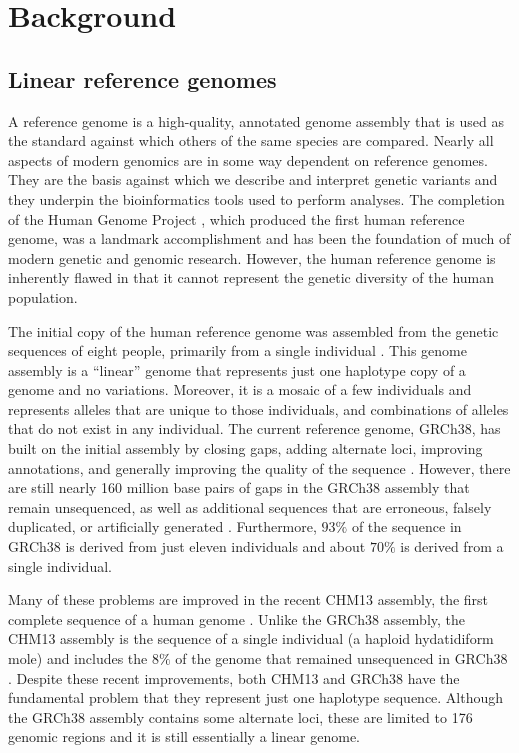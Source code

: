 \documentclass[11pt]{ucscthesis}
\begin{document}
\chapter{Background}
\label{chapter:background}

\section{Linear reference genomes}
\label{sec:background:linear-genomes}

A reference genome is a high-quality, annotated genome assembly that is used as the standard against which others of the same species are compared. 
Nearly all aspects of modern genomics are in some way dependent on reference genomes.
They are the basis against which we describe and interpret genetic variants and they underpin the bioinformatics tools used to perform analyses.
The completion of the Human Genome Project \cite{lander_initial_2001}, which produced the first human reference genome, was a landmark accomplishment and has been the foundation of much of modern genetic and genomic research.
However, the human reference genome is inherently flawed in that it cannot represent the genetic diversity of the human population.

The initial copy of the human reference genome was assembled from the genetic sequences of eight people, primarily from a single individual \cite{lander_initial_2001}.
This genome assembly is a ``linear'' genome that represents just one haplotype copy of a genome and no variations.
Moreover, it is a mosaic of a few individuals and represents alleles that are unique to those individuals, and combinations of alleles that do not exist in any individual.
The current reference genome, GRCh38, has built on the initial assembly by closing gaps, adding alternate loci, improving annotations, and generally improving the quality of the sequence \cite{schneider_evaluation_2017}.
However, there are still nearly 160 million base pairs of gaps in the GRCh38 assembly that remain unsequenced, as well as additional sequences that are erroneous, falsely duplicated, or artificially generated \cite{schneider_evaluation_2017,nurk_complete_2022}.
Furthermore, $93\%$ of the sequence in GRCh38 is derived from just eleven individuals and about $70\%$ is derived from a single individual.

Many of these problems are improved in the recent CHM13 assembly, the first complete sequence of a human genome \cite{nurk_complete_2022}.
Unlike the GRCh38 assembly, the CHM13 assembly is the sequence of a single individual (a haploid hydatidiform mole) and includes the $8\%$ of the genome that remained unsequenced in GRCh38 \cite{nurk_complete_2022}.
Despite these recent improvements, both CHM13 and GRCh38 have the fundamental problem that they represent just one haplotype sequence.
Although the GRCh38 assembly contains some alternate loci, these are limited to 176 genomic regions \cite{schneider_evaluation_2017} and it is still essentially a linear genome.
\end{document}
